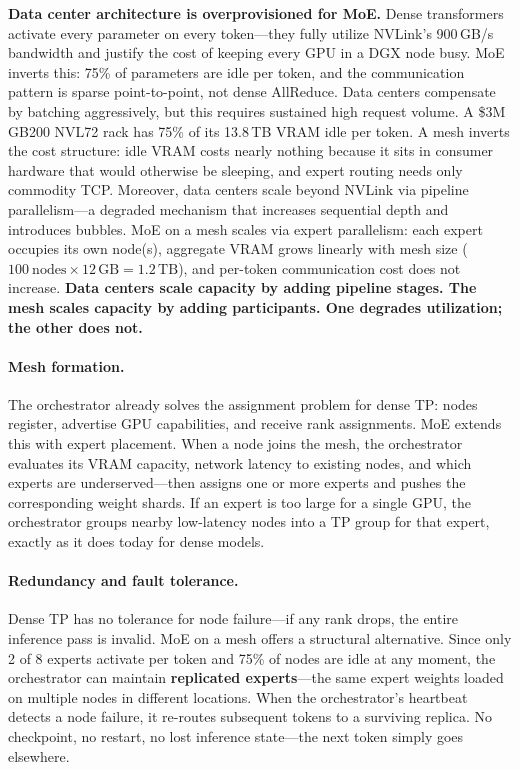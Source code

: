 \documentclass[10pt,twocolumn]{article}
\begin{document}
\textbf{Data center architecture is overprovisioned for MoE.} Dense
transformers activate every parameter on every token---they fully utilize
NVLink's 900\,GB/s bandwidth and justify the cost of keeping every GPU in
a DGX node busy.  MoE inverts this: 75\% of parameters are idle per token,
and the communication pattern is sparse point-to-point, not dense
AllReduce.  Data centers compensate by batching aggressively, but this
requires sustained high request volume.  A \$3M GB200 NVL72 rack has 75\%
of its 13.8\,TB VRAM idle per token.  A mesh inverts the cost structure:
idle VRAM costs nearly nothing because it sits in consumer hardware that
would otherwise be sleeping, and expert routing needs only commodity TCP\@.
Moreover, data centers scale beyond NVLink via pipeline
parallelism---a degraded mechanism that increases sequential depth and
introduces bubbles.  MoE on a mesh scales via expert parallelism: each
expert occupies its own node(s), aggregate VRAM grows linearly with mesh
size ($100~\text{nodes} \times 12\,\text{GB} = 1.2\,\text{TB}$), and
per-token communication cost does not increase.  \textbf{Data centers
scale capacity by adding pipeline stages.  The mesh scales capacity by
adding participants.  One degrades utilization; the other does not.}

\paragraph{Mesh formation.}
The orchestrator already solves the assignment problem for dense TP: nodes
register, advertise GPU capabilities, and receive rank assignments.  MoE
extends this with expert placement.  When a node joins the mesh, the
orchestrator evaluates its VRAM capacity, network latency to existing
nodes, and which experts are underserved---then assigns one or more experts
and pushes the corresponding weight shards.  If an expert is too large for
a single GPU, the orchestrator groups nearby low-latency nodes into a TP
group for that expert, exactly as it does today for dense models.

\paragraph{Redundancy and fault tolerance.}
Dense TP has no tolerance for node failure---if any rank drops, the entire
inference pass is invalid.  MoE on a mesh offers a structural alternative.
Since only 2 of 8 experts activate per token and 75\% of nodes are idle at
any moment, the orchestrator can maintain \textbf{replicated
experts}---the same expert weights loaded on multiple nodes in different
locations.  When the orchestrator's heartbeat detects a node failure, it
re-routes subsequent tokens to a surviving replica.  No checkpoint, no
restart, no lost inference state---the next token simply goes elsewhere.
\end{document}
